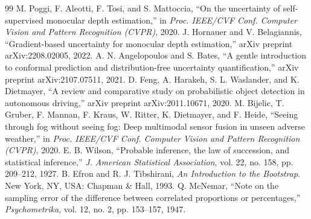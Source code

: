 \documentclass[conference,a4paper]{IEEEtran}
\begin{document}
\begin{thebibliography}{99}
 M. Poggi, F. Aleotti, F. Tosi, and S. Mattoccia, ``On the uncertainty of self-supervised monocular depth estimation,'' in \emph{Proc. IEEE/CVF Conf. Computer Vision and Pattern Recognition (CVPR)}, 2020.
 J. Hornauer and V. Belagiannis, ``Gradient-based uncertainty for monocular depth estimation,'' arXiv preprint arXiv:2208.02005, 2022.
 A. N. Angelopoulos and S. Bates, ``A gentle introduction to conformal prediction and distribution-free uncertainty quantification,'' arXiv preprint arXiv:2107.07511, 2021.
 D. Feng, A. Harakeh, S. L. Waslander, and K. Dietmayer, ``A review and comparative study on probabilistic object detection in autonomous driving,'' arXiv preprint arXiv:2011.10671, 2020.
 M. Bijelic, T. Gruber, F. Mannan, F. Kraus, W. Ritter, K. Dietmayer, and F. Heide, ``Seeing through fog without seeing fog: Deep multimodal sensor fusion in unseen adverse weather,'' in \emph{Proc. IEEE/CVF Conf. Computer Vision and Pattern Recognition (CVPR)}, 2020.
 E. B. Wilson, ``Probable inference, the law of succession, and statistical inference,'' \emph{J. American Statistical Association}, vol. 22, no. 158, pp. 209--212, 1927.
 B. Efron and R. J. Tibshirani, \emph{An Introduction to the Bootstrap}. New York, NY, USA: Chapman \& Hall, 1993.
 Q. McNemar, ``Note on the sampling error of the difference between correlated proportions or percentages,'' \emph{Psychometrika}, vol. 12, no. 2, pp. 153--157, 1947.
\end{thebibliography}
\end{document}

